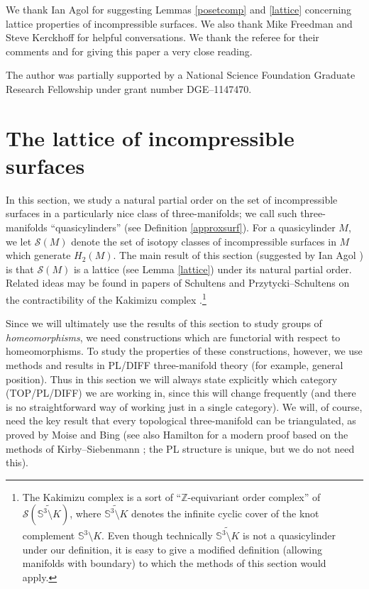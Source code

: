 \documentclass[12pt]{article}
\theoremstyle{plain}
\theoremstyle{definition}
\theoremstyle{remark}
\numberwithin{equation}{section}
\begin{document}
We thank Ian Agol for suggesting Lemmas \ref{posetcomp} and \ref{lattice} concerning lattice properties of incompressible surfaces.  We also thank Mike Freedman and Steve Kerckhoff for helpful conversations.  We thank the referee for their comments and for giving this paper a very close reading.

The author was partially supported by a National Science Foundation Graduate Research Fellowship under grant number DGE--1147470.

\section{The lattice of incompressible surfaces}\label{incompressiblesection}

In this section, we study a natural partial order on the set of incompressible surfaces in a particularly nice class of three-manifolds; we call such three-manifolds ``quasicylinders'' (see Definition \ref{approxsurf}).  For a quasicylinder $M$, we let $\mathcal S(M)$ denote the set of isotopy classes of incompressible surfaces in $M$ which generate $H_2(M)$.  The main result of this section (suggested by Ian Agol \cite{mathoverflow}) is that $\mathcal S(M)$ is a lattice (see Lemma \ref{lattice}) under its natural partial order.  Related ideas may be found in papers of Schultens \cite{schultens} and Przytycki--Schultens \cite{przytyckischultens} on the contractibility of the Kakimizu complex \cite{kakimizu}.\footnote{The Kakimizu complex is a sort of ``$\mathbb Z$-equivariant order complex'' of $\mathcal S(\widetilde{\mathbb S^3\setminus K})$, where $\widetilde{\mathbb S^3\setminus K}$ denotes the infinite cyclic cover of the knot complement $\mathbb S^3\setminus K$.  Even though technically $\widetilde{\mathbb S^3\setminus K}$ is not a quasicylinder under our definition, it is easy to give a modified definition (allowing manifolds with boundary) to which the methods of this section would apply.}

Since we will ultimately use the results of this section to study groups of \emph{homeomorphisms}, we need constructions which are functorial with respect to homeomorphisms.  To study the properties of these constructions, however, we use methods and results in PL/DIFF three-manifold theory (for example, general position).  Thus in this section we will always state explicitly which category (TOP/PL/DIFF) we are working in, since this will change frequently (and there is no straightforward way of working just in a single category).  We will, of course, need the key result that every topological three-manifold can be triangulated, as proved by Moise \cite{moise} and Bing \cite{bing} (see also Hamilton \cite{hamilton} for a modern proof based on the methods of Kirby--Siebenmann \cite{kirsie}; the PL structure is unique, but we do not need this).
\end{document}
